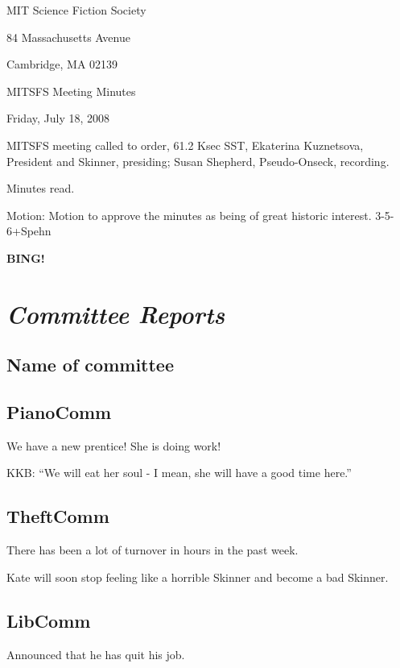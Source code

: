 \documentclass[10pt]{article}
\newcommand{\bing}{{\bf BING!} }
\newcommand{\goto}[1]{\bing \vskip 12pt \section*{{\em{#1}}}}
\begin{document}
\begin{center}

MIT Science Fiction Society

84 Massachusetts Avenue

Cambridge, MA 02139

\vspace{12pt}

MITSFS Meeting Minutes

Friday, July 18, 2008

\end{center}

\vspace{18pt}

\setlength{\parskip}{6pt}

\noindent
MITSFS meeting called to order, 61.2 Ksec SST,
Ekaterina Kuznetsova, President and Skinner, presiding; Susan Shepherd, Pseudo-Onseck, recording.

Minutes read.

Motion: Motion to approve the minutes as being of great historic interest. 3-5-6+Spehn

\BING

\goto{Committee Reports}

\subsection*{Name of committee}

\subsection*{PianoComm}
We have a new prentice! She is doing work!

KKB: ``We will eat her soul - I mean, she will have a good time here.''

\subsection*{TheftComm}

There has been a lot of turnover in hours in the past week.

Kate will soon stop feeling like a horrible Skinner and become a bad Skinner.

\subsection*{LibComm}

Announced that he has quit his job.
\end{document}
